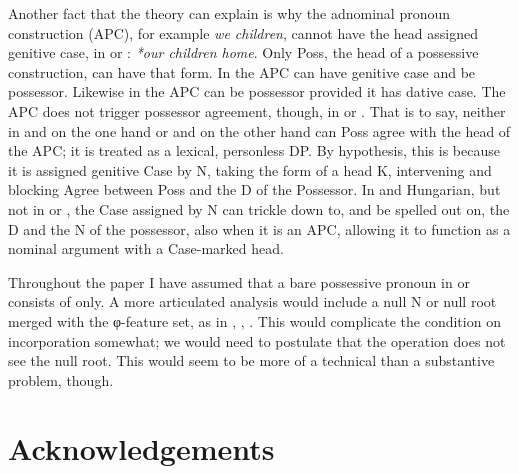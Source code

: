 \documentclass[output=paper]{langsci/langscibook}
\begin{document}
Another fact that the theory can explain is why the adnominal pronoun
construction (\gls{APC}), for example
\emph{we children}, cannot have the head assigned genitive
case, in  or : \emph{*our children home}. Only Poss, the head of
a possessive construction, can have that form. In  the APC can have
genitive case and be possessor. Likewise in  the
\gls{APC} can be possessor provided it has
dative case. The \gls{APC} does not trigger
possessor agreement, though, in  or . That is to say, neither
in  and  on the one hand or  and  on the other
hand can Poss agree with the head of the APC; it is treated as a lexical,
personless DP. By hypothesis, this is because it is assigned
genitive Case by N, taking the form of a head K, intervening
and blocking Agree between Poss and the D of the Possessor. In  and
Hungarian, but not in  or , the Case assigned by N can trickle
down to, and be spelled out on, the D and the N of the possessor, also when it
is an \gls{APC}, allowing it to function as
a nominal argument with a Case-marked head.

Throughout the paper I have assumed that a bare possessive pronoun in 
or  consists of  only. A more articulated analysis would
include a null N or null root merged with the φ-feature set, as in
\citet{Panagiotidis2002}, \citet{Elbourne2008}, \citet{HolmbergPhimsawat2017}.
This would complicate the condition on incorporation somewhat; we would need to
postulate that the  operation does not see the null root. This
would seem to be more of a technical than a substantive problem, though.\largerpage

\printchapterglossary{}

\section*{Acknowledgements}
\end{document}
